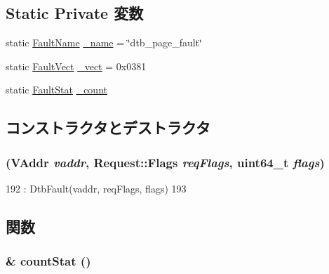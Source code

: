 \subsection*{Static Private 変数}
\begin{DoxyCompactItemize}
\item 
static \hyperlink{sim_2faults_8hh_abb196df64725e5c2568c900cf130d8d7}{FaultName} \hyperlink{classAlphaISA_1_1DtbPageFault_ac79073ffcd2c66a09bcd3bd3ad206019}{\_\-name} = \char`\"{}dtb\_\-page\_\-fault\char`\"{}
\item 
static \hyperlink{classm5_1_1params_1_1Addr}{FaultVect} \hyperlink{classAlphaISA_1_1DtbPageFault_ad9e5855b9db0b2824cf6c507be4a872e}{\_\-vect} = 0x0381
\item 
static \hyperlink{classStats_1_1Scalar}{FaultStat} \hyperlink{classAlphaISA_1_1DtbPageFault_a4bff925c412f331c5aaf6a39b79619ff}{\_\-count}
\end{DoxyCompactItemize}


\subsection{コンストラクタとデストラクタ}
\hypertarget{classAlphaISA_1_1DtbPageFault_ae4f2171aefd458e8a5efafda07781ef6}{
\subsubsection[{DtbPageFault}]{ ({\bf VAddr} {\em vaddr}, \/  {\bf Request::Flags} {\em reqFlags}, \/  uint64\_\-t {\em flags})}}
\label{classAlphaISA_1_1DtbPageFault_ae4f2171aefd458e8a5efafda07781ef6}



\begin{DoxyCode}
192         : DtbFault(vaddr, reqFlags, flags)
193     { }
\end{DoxyCode}


\subsection{関数}
\hypertarget{classAlphaISA_1_1DtbPageFault_a6c79663c761ff57265459f7e3aefaf4c}{
\subsubsection[{countStat}]{\& countStat ()}}
\label{classAlphaISA_1_1DtbPageFault_a6c79663c761ff57265459f7e3aefaf4c}


